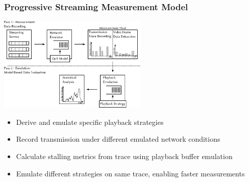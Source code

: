 \documentclass{beamer}
\begin{document}
\begin{frame}
	\frametitle{Progressive Streaming Measurement Model}

	\begin{center}
		\includegraphics[height=4.5cm]{../../chapters/03-streaming/images/measurement-model.pdf}
	\end{center}

	\begin{itemize}
		\item Derive and emulate specific playback strategies
		\item Record transmission under different emulated network conditions
		\item Calculate stalling metrics from trace using playback buffer emulation
		\item Emulate different strategies on same trace, enabling faster measurements
	\end{itemize}



\end{frame}






\end{document}

